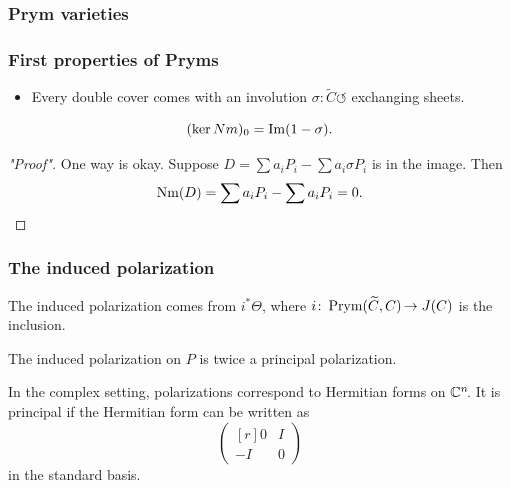 \begin{frame}
\frametitle{Prym varieties}



\end{frame}


\begin{frame}
\frametitle{First properties of Pryms}

\begin{itemize}
	\item Every double cover comes with an involution $\sigma \colon  \widetilde C \circlearrowleft$ exchanging sheets.
\end{itemize}


\begin{proposition}
\[
(\ker Nm)_0 = \operatorname{Im}(1-\sigma).
\]
\end{proposition}
\begin{proof}["Proof"]
One way is okay. Suppose $D= \sum a_i P_i - \sum a_i \sigma{P_i}$ is in the image. Then
\[
\operatorname{Nm}(D) = \sum a_i P_i - \sum a_i P_i = 0.
\]
\end{proof}
\end{frame}

\begin{frame}
\frametitle{The induced polarization}

The induced polarization comes from \alert{$i^\ast \Theta$}, where $i\colon\operatorname{Prym}(\widetilde C, C )\mkern-2mu \to J(C)$ is the inclusion.

\begin{theorem}
The induced polarization on $P$ is twice a principal polarization.
\end{theorem}
\pause
\begin{remark}
In the complex setting, polarizations correspond to Hermitian forms on $\mathbb{C}^n\mkern-3mu$. It is principal if the Hermitian form can be written as 
\[
\begin{pmatrix*}[r]
0 & I \\
-I &0
\end{pmatrix*}
\]
in the standard basis.
\end{remark}
\end{frame}

